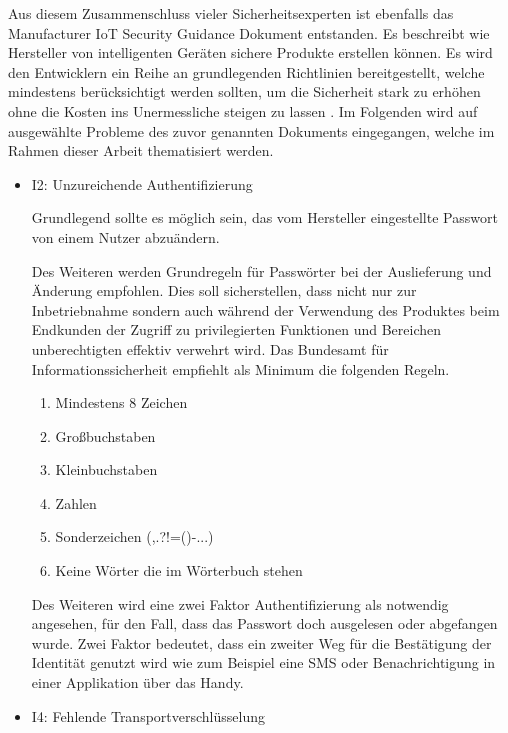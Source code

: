     Aus diesem Zusammenschluss vieler Sicherheitsexperten ist ebenfalls das Manufacturer \ac{IoT} Security Guidance Dokument entstanden. Es beschreibt wie Hersteller von intelligenten Geräten sichere Produkte erstellen können. Es wird den Entwicklern ein Reihe an grundlegenden Richtlinien bereitgestellt, welche mindestens berücksichtigt werden sollten, um die Sicherheit stark zu erhöhen ohne die Kosten ins Unermessliche steigen zu lassen \cite{stahl_2017}.
    Im Folgenden wird auf ausgewählte Probleme des zuvor genannten Dokuments eingegangen, welche im Rahmen dieser Arbeit thematisiert werden.
    \begin{itemize}
        \item I2:  Unzureichende Authentifizierung
        
        Grundlegend sollte es möglich sein, das vom Hersteller eingestellte Passwort von einem Nutzer abzuändern.
        
        Des Weiteren werden Grundregeln für Passwörter bei der Auslieferung und Änderung empfohlen. Dies soll sicherstellen, dass nicht nur zur Inbetriebnahme sondern auch während der Verwendung des Produktes beim Endkunden der Zugriff zu privilegierten Funktionen und Bereichen unberechtigten effektiv verwehrt wird. Das Bundesamt für Informationssicherheit \cite{bundesamt_fuer_sicherheit_in_der_informationstechnik_2018} 
        empfiehlt als Minimum die folgenden Regeln.
        \begin{enumerate}
            \item Mindestens 8 Zeichen
            \item Großbuchstaben
            \item Kleinbuchstaben
            \item Zahlen
            \item Sonderzeichen (,.?!=()-...)
            \item Keine Wörter die im Wörterbuch stehen
        \end{enumerate}
        
        Des Weiteren wird eine zwei Faktor Authentifizierung als notwendig angesehen, für den Fall, dass das Passwort doch ausgelesen oder abgefangen wurde. Zwei Faktor bedeutet, dass ein zweiter Weg für die Bestätigung der Identität genutzt wird wie zum Beispiel eine SMS oder Benachrichtigung in einer Applikation über das Handy.
        
        \item I4: Fehlende Transportverschlüsselung
        

\end{itemize}
